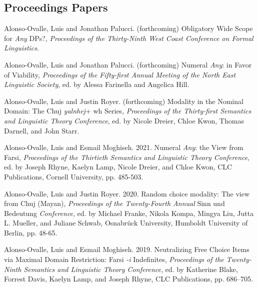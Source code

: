 \documentclass[11pt]{article}
\begin{document}

\subsection*{Proceedings Papers}

Alonso-Ovalle, Luis and Jonathan Palucci. (forthcoming) Obligatory Wide Scope for \textit{Any} DPs?, \textit{Proceedings of the Thirty-Ninth West Coast Conference on Formal Linguistics}.

Alonso-Ovalle, Luis and Jonathan Palucci. (forthcoming) Numeral \textit{Any}: in Favor of Viability, \textit{Proceedings of the Fifty-first Annual Meeting of the North East Linguistic Society}, ed. by Alessa Farinella and Angelica Hill.

Alonso-Ovalle, Luis and Justin Royer. (forthcoming) Modality in the Nominal Domain: The Chuj \textit{yalnhej}+ wh Series, \textit{Proceedings of the Thirty-first Semantics and Linguistic Theory Conference}, ed. by Nicole Dreier, Chloe Kwon, Thomas Darnell, and John Starr.

 Alonso-Ovalle, Luis and Esmail Moghiseh. 2021. Numeral \textit{Any}: the View from Farsi, \textit{Proceedings of the Thirtieth Semantics and Linguistic Theory Conference}, ed. by Joseph Rhyne, Kaelyn Lamp, Nicole Dreier, and Chloe Kwon, CLC Publications, Cornell University, pp. 485-503. %

      
    Alonso-Ovalle, Luis and Justin Royer. 2020. Random choice modality: The view from Chuj (Mayan), \textit{Proceedings of the Twenty-Fourth Annual} Sinn und Bedeutung \textit{Conference}, ed. by Michael Franke, Nikola Kompa, Mingya Liu, Jutta L. Mueller, and Juliane Schwab, Osnabr\"{u}ck University, Humboldt University of Berlin, pp. 48-65. 
    
      Alonso-Ovalle, Luis and Esmail Moghiseh. 2019. Neutralizing Free Choice Items via Maximal Domain
Restriction: Farsi \textit{-i} Indefinites, \textit{Proceedings of the Twenty-Ninth Semantics and Linguistic Theory Conference}, ed. by Katherine Blake, Forrest Davis, Kaelyn Lamp, and Joseph Rhyne, CLC Publications, pp. 686–705. 
      
\end{document}
